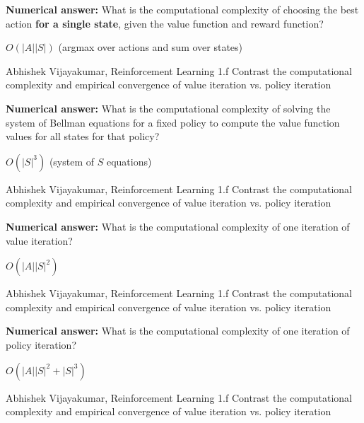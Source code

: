 \begin{parts}
\begin{subparts}
\subpart[1] \textbf{Numerical answer:} What is the computational complexity of choosing the best action \textbf{for a single state}, given the value function and reward function?
\begin{tcolorbox}[fit,height=1cm, width=2cm, blank, borderline={1pt}{-2pt}]
\end{tcolorbox}
\begin{soln}
$O(|A| |S|)$ (argmax over actions and sum over states)
\end{soln}
\begin{qauthor}
Abhishek Vijayakumar, Reinforcement Learning 1.f Contrast the computational complexity and empirical convergence of value iteration vs. policy iteration
\end{qauthor}

\subpart[1] \textbf{Numerical answer:} What is the computational complexity of solving the system of Bellman equations for a fixed policy to compute the value function values for all states for that policy?
\begin{tcolorbox}[fit,height=1cm, width=2cm, blank, borderline={1pt}{-2pt}]
\end{tcolorbox}
\begin{soln}
$O(|S|^3)$ (system of $S$ equations)
\end{soln}
\begin{qauthor}
Abhishek Vijayakumar, Reinforcement Learning 1.f Contrast the computational complexity and empirical convergence of value iteration vs. policy iteration
\end{qauthor}

\subpart[1] \textbf{Numerical answer:} What is the computational complexity of one iteration of value iteration?
\begin{tcolorbox}[fit,height=1cm, width=2cm, blank, borderline={1pt}{-2pt}]
\end{tcolorbox}
\begin{soln}
$O(|A| |S|^2)$
\end{soln}
\begin{qauthor}
Abhishek Vijayakumar, Reinforcement Learning 1.f Contrast the computational complexity and empirical convergence of value iteration vs. policy iteration
\end{qauthor}

\subpart[1] \textbf{Numerical answer:} What is the computational complexity of one iteration of policy iteration?
\begin{tcolorbox}[fit,height=1cm, width=2cm, blank, borderline={1pt}{-2pt}]
\end{tcolorbox}
\begin{soln}
$O(|A| |S|^2 + |S|^3)$
\end{soln}
\begin{qauthor}
Abhishek Vijayakumar, Reinforcement Learning 1.f Contrast the computational complexity and empirical convergence of value iteration vs. policy iteration
\end{qauthor}


\end{subparts}
\end{parts}
